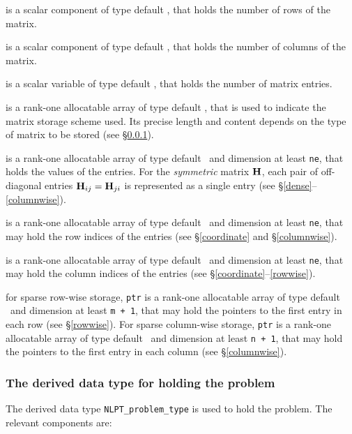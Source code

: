 \documentclass{galahad}
\begin{document}
\begin{description}

 is a scalar component of type default \integer,
that holds the number of rows of the matrix.

 is a scalar component of type default \integer,
that holds the number of columns of the matrix.

 is a scalar variable of type default \integer, that
holds the number of matrix entries.

 is a rank-one allocatable array of type default \character, that
is used to indicate the matrix storage scheme used. Its precise length and
content depends on the type of matrix to be stored (see \S\ref{typeprob}).

 is a rank-one allocatable array of type default \realdp\,
and dimension at least {\tt ne}, that holds the values of the entries.
For the {\em symmetric} matrix ${\mathbf{H}}$, each pair of off-diagonal entries
${\mathbf{H}}_{ij} = {\mathbf{H}}_{ji}$ is represented
as a single entry (see \S\ref{dense}--\ref{columnwise}).

 is a rank-one allocatable array of type default \integer\
and dimension at least {\tt ne}, that may hold the row indices of the entries
(see \S\ref{coordinate} and \S\ref{columnwise}).

 is a rank-one allocatable array of type default \integer\
and dimension at least {\tt ne}, that may hold the column indices of the entries
(see \S\ref{coordinate}--\ref{rowwise}).

 for sparse row-wise storage, {\tt ptr} is a rank-one
allocatable array of type default \integer\ and dimension at least
{\tt m + 1}, that may hold the pointers to the first entry in each row
(see \S\ref{rowwise}).  For sparse column-wise storage, {\tt ptr}
is a rank-one allocatable array of type default \integer\ and
dimension at least {\tt n + 1}, that may hold the pointers to the
first entry in each column (see \S\ref{columnwise}).

\end{description}


\subsubsection{The derived data type for holding the problem}\label{typeprob}
The derived data type {\tt NLPT\_problem\_type} is used to hold the
problem. The relevant components are:
\end{document}
